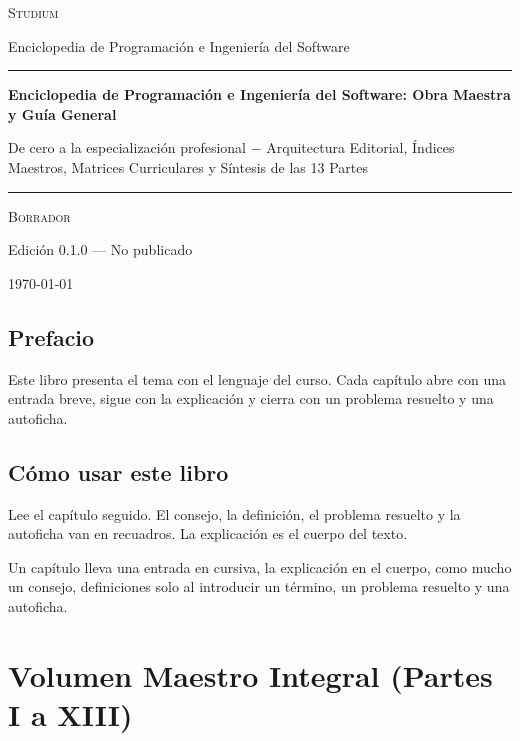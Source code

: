 \documentclass{book}
\begin{document}
\frontmatter
\thispagestyle{empty}
\setlength{\parindent}{0pt}
\vspace*{0.08\textheight}
{\normalsize\scshape\color{studiumInk} Studium\par}
{\small Enciclopedia de Programación e Ingeniería del Software\par}
\vspace{0.55em}
{\color{studiumRule}\rule{\linewidth}{0.9pt}\par}
\vspace{0.16\textheight}
{\raggedright\Huge\bfseries Enciclopedia de Programación e Ingeniería del Software: Obra Maestra y Guía General\par}
\vspace{0.9em}
{\raggedright\Large\color{studiumInk} De cero a la especialización profesional \(-\) Arquitectura Editorial, Índices Maestros, Matrices Curriculares y Síntesis de las 13 Partes\par}
\vfill
{\color{studiumRule}\rule{0.36\linewidth}{0.45pt}\par}
\vspace{1.05em}
{\large\scshape Borrador\par}
\vspace{0.45em}
{\normalsize Edición 0.1.0 --- No publicado\par}
\vspace{0.4em}
{\normalsize\today\par}
\vspace*{0.08\textheight}
\clearpage
\chapter{Prefacio}
\noindent Este libro presenta el tema con el lenguaje del curso. Cada capítulo abre con una entrada breve, sigue con la explicación y cierra con un problema resuelto y una autoficha.
\chapter{Cómo usar este libro}
\noindent Lee el capítulo seguido. El consejo, la definición, el problema resuelto y la autoficha van en recuadros. La explicación es el cuerpo del texto.

\noindent Un capítulo lleva una entrada en cursiva, la explicación en el cuerpo, como mucho un consejo, definiciones solo al introducir un término, un problema resuelto y una autoficha.
\tableofcontents
\mainmatter

\part{Volumen Maestro Integral (Partes I a XIII)}
\end{document}
